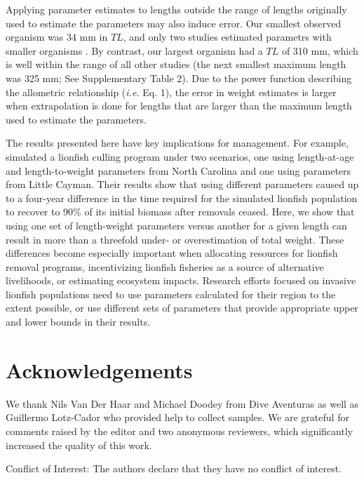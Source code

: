 \documentclass[fleqn,10pt,lineno]{wlpeerj} %
\begin{document}
Applying parameter estimates to lengths outside the range of lengths
originally used to estimate the parameters may also induce error. Our
smallest observed organism was 34 mm in \(TL\), and only two studies
estimated parametrs with smaller organisms
\citep{edwards_2014,sabidoitza_2016}. By contrast, our largest organism
had a \(TL\) of 310 mm, which is well within the range of all other
studies (the next smallest maximum length was 325 mm; See Supplementary
Table 2). Due to the power function describing the allometric
relationship (\emph{i.e.} Eq. 1), the error in weight estimates is
larger when extrapolation is done for lengths that are larger than the
maximum length used to estimate the parameters.

The results presented here have key implications for management. For
example, \citet{edwards_2014} simulated a lionfish culling program under
two scenarios, one using length-at-age and length-to-weight parameters
from North Carolina and one using parameters from Little Cayman. Their
results show that using different parameters caused up to a four-year
difference in the time required for the simulated lionfish population to
recover to 90\% of its initial biomass after removals ceased. Here, we
show that using one set of length-weight parameters versus another for a
given length can result in more than a threefold under- or
overestimation of total weight. These differences become especially
important when allocating resources for lionfish removal programs,
incentivizing lionfish fisheries as a source of alternative livelihoods,
or estimating ecosystem impacts. Research efforts focused on invasive
lionfish populations need to use parameters calculated for their region
to the extent possible, or use different sets of parameters that provide
appropriate upper and lower bounds in their results.

\section*{Acknowledgements}

We thank Nils Van Der Haar and Michael Doodey from Dive Aventuras as
well as Guillermo Lotz-Cador who provided help to collect samples. We
are grateful for comments raised by the editor and two anonymous
reviewers, which significantly increased the quality of this work.

Conflict of Interest: The authors declare that they have no conflict of
interest.


\end{document}
